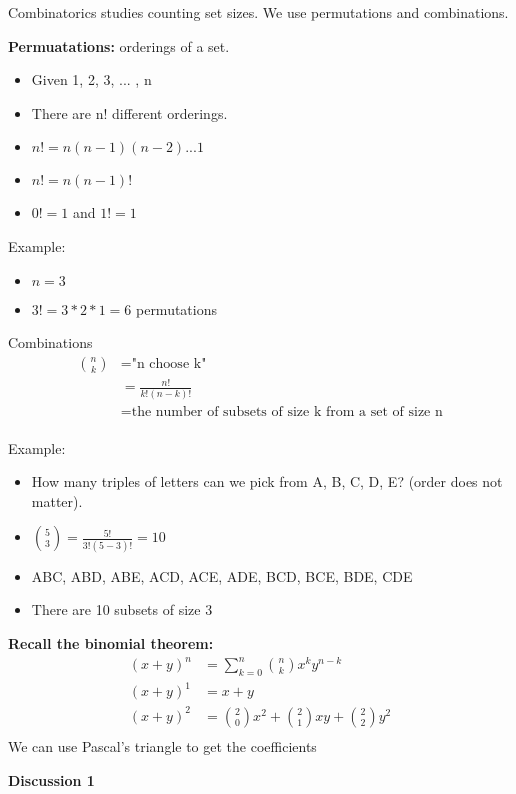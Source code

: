 \documentclass[10pt]{article}
\begin{document}
Combinatorics studies counting set sizes. We use permutations and combinations.

\textbf{Permuatations:} orderings of a set.
\begin{itemize}
    \item Given {1, 2, 3, ... , n}
    \item There are n! different orderings.
    \item $n! = n(n - 1)(n - 2) ... 1$
    \item $n! = n(n - 1)!$
    \item $0! = 1$ and $1! = 1$
\end{itemize}

Example:
\begin{itemize}
    \item $n = 3$
    \item $3! = 3 * 2 * 1 = 6$ permutations
\end{itemize}

Combinations
$$ \begin{aligned} 
    \binom{n}{k} &= \text{"n choose k"} \\
                 &= \frac{n!}{k!(n - k)!} \\
                 &= \text{the number of subsets of size k from a set of size n}
                 \\
\end{aligned}$$

Example:
\begin{itemize}
    \item How many triples of letters can we pick from A, B, C, D, E? (order
        does not matter).
    \item $\binom{5}{3} = \frac{5!}{3!(5 - 3)!} = 10$
    \item ABC, ABD, ABE, ACD, ACE, ADE, BCD, BCE, BDE, CDE
    \item There are 10 subsets of size 3
\end{itemize}

\textbf{Recall the binomial theorem:}
$$\begin{aligned}
    (x + y)^n &= \sum_{k = 0}^{n} \binom{n}{k} x^ky^{n - k}\\
    (x + y)^1 &= x + y \\
    (x + y)^2 &= \binom{2}{0}x^2 + \binom{2}{1}xy + \binom{2}{2}y^2 \\
\end{aligned}$$
We can use Pascal's triangle to get the coefficients

\begin{center}
	\Large \textbf{Discussion 1}
\end{center}
\normalsize
\end{document}
